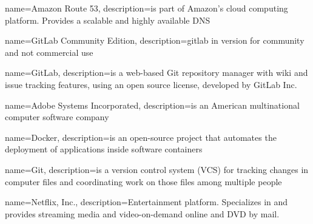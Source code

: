 
{
	name={Amazon Route 53},
	description={is part of Amazon's cloud computing platform. Provides a scalable and highly available \gls{DNS}}
}

{
	name={GitLab Community Edition},
	description={\gls{gitlab} in version for community and not commercial use}
}

{
	name={GitLab},
	description={is a web-based Git repository manager with wiki and issue tracking features, using an open source license, developed by GitLab Inc. \cite{bib:gitlab-wiki}}
}

{
	name={Adobe Systems Incorporated},
	description={is an American multinational computer software company \cite{bib:adobe}}
}

{
	name={Docker},
	description={is an open-source project that automates the deployment of applications inside software containers \cite{bib:docker}}
}

{
	name={Git},
	description={is a version control system (VCS) for tracking changes in computer files and coordinating work on those files among multiple people}
}

{
	name={Netflix, Inc.},
	description={Entertainment platform. Specializes in and provides streaming media and video-on-demand online and DVD by mail. \cite{bib:netflix}}
}